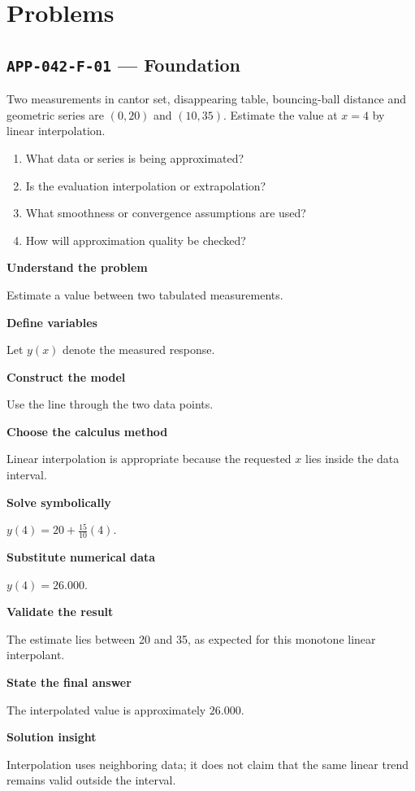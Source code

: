 \documentclass[11pt]{book}
\newcommand{\pid}[1]{\texttt{#1}}
\begin{document}
\section*{Problems}
\subsection*{\pid{APP-042-F-01} — Foundation}
\begin{problembox}
Two measurements in cantor set, disappearing table, bouncing-ball distance and geometric series are $(0,20)$ and $(10,35)$. Estimate the value at $x=4$ by linear interpolation.
\end{problembox}
\begin{promptbox}\begin{enumerate}
\item What data or series is being approximated?
\item Is the evaluation interpolation or extrapolation?
\item What smoothness or convergence assumptions are used?
\item How will approximation quality be checked?
\end{enumerate}\end{promptbox}
\begin{solutionbox}
\textbf{Understand the problem}\par Estimate a value between two tabulated measurements.\par\medskip
\textbf{Define variables}\par Let $y(x)$ denote the measured response.\par\medskip
\textbf{Construct the model}\par Use the line through the two data points.\par\medskip
\textbf{Choose the calculus method}\par Linear interpolation is appropriate because the requested $x$ lies inside the data interval.\par\medskip
\textbf{Solve symbolically}\par $y(4)=20+\frac{15}{10}(4)$.\par\medskip
\textbf{Substitute numerical data}\par $y(4)=26.000$.\par\medskip
\textbf{Validate the result}\par The estimate lies between 20 and 35, as expected for this monotone linear interpolant.\par\medskip
\textbf{State the final answer}\par The interpolated value is approximately $26.000$.\par\medskip
\textbf{Solution insight}\par Interpolation uses neighboring data; it does not claim that the same linear trend remains valid outside the interval.\par\medskip
\end{solutionbox}
\end{document}
